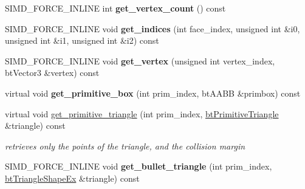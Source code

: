 \begin{DoxyCompactItemize}
\item 
\hypertarget{classbt_g_impact_mesh_shape_part_1_1_trimesh_primitive_manager_ab06cf91e5637ae4978a2c95290c62ed7}{S\+I\+M\+D\+\_\+\+F\+O\+R\+C\+E\+\_\+\+I\+N\+L\+I\+N\+E int {\bfseries get\+\_\+vertex\+\_\+count} () const }\label{classbt_g_impact_mesh_shape_part_1_1_trimesh_primitive_manager_ab06cf91e5637ae4978a2c95290c62ed7}

\item 
\hypertarget{classbt_g_impact_mesh_shape_part_1_1_trimesh_primitive_manager_a08caaa2a067832b4493d67aea99b51c9}{S\+I\+M\+D\+\_\+\+F\+O\+R\+C\+E\+\_\+\+I\+N\+L\+I\+N\+E void {\bfseries get\+\_\+indices} (int face\+\_\+index, unsigned int \&i0, unsigned int \&i1, unsigned int \&i2) const }\label{classbt_g_impact_mesh_shape_part_1_1_trimesh_primitive_manager_a08caaa2a067832b4493d67aea99b51c9}

\item 
\hypertarget{classbt_g_impact_mesh_shape_part_1_1_trimesh_primitive_manager_a89dbcd7abd301900c5e85bf82d4a829b}{S\+I\+M\+D\+\_\+\+F\+O\+R\+C\+E\+\_\+\+I\+N\+L\+I\+N\+E void {\bfseries get\+\_\+vertex} (unsigned int vertex\+\_\+index, bt\+Vector3 \&vertex) const }\label{classbt_g_impact_mesh_shape_part_1_1_trimesh_primitive_manager_a89dbcd7abd301900c5e85bf82d4a829b}

\item 
\hypertarget{classbt_g_impact_mesh_shape_part_1_1_trimesh_primitive_manager_a94b651790c8e2d8e737f8a39dc3053c2}{virtual void {\bfseries get\+\_\+primitive\+\_\+box} (int prim\+\_\+index, bt\+A\+A\+B\+B \&primbox) const }\label{classbt_g_impact_mesh_shape_part_1_1_trimesh_primitive_manager_a94b651790c8e2d8e737f8a39dc3053c2}

\item 
\hypertarget{classbt_g_impact_mesh_shape_part_1_1_trimesh_primitive_manager_af0e4530a36fb1647c83b79eafd7a7415}{virtual void \hyperlink{classbt_g_impact_mesh_shape_part_1_1_trimesh_primitive_manager_af0e4530a36fb1647c83b79eafd7a7415}{get\+\_\+primitive\+\_\+triangle} (int prim\+\_\+index, \hyperlink{classbt_primitive_triangle}{bt\+Primitive\+Triangle} \&triangle) const }\label{classbt_g_impact_mesh_shape_part_1_1_trimesh_primitive_manager_af0e4530a36fb1647c83b79eafd7a7415}

\begin{DoxyCompactList}\small\item\em retrieves only the points of the triangle, and the collision margin \end{DoxyCompactList}\item 
\hypertarget{classbt_g_impact_mesh_shape_part_1_1_trimesh_primitive_manager_a2fd488aedd84794841f4709d882b1d7e}{S\+I\+M\+D\+\_\+\+F\+O\+R\+C\+E\+\_\+\+I\+N\+L\+I\+N\+E void {\bfseries get\+\_\+bullet\+\_\+triangle} (int prim\+\_\+index, \hyperlink{classbt_triangle_shape_ex}{bt\+Triangle\+Shape\+Ex} \&triangle) const }\label{classbt_g_impact_mesh_shape_part_1_1_trimesh_primitive_manager_a2fd488aedd84794841f4709d882b1d7e}

\end{DoxyCompactItemize}
